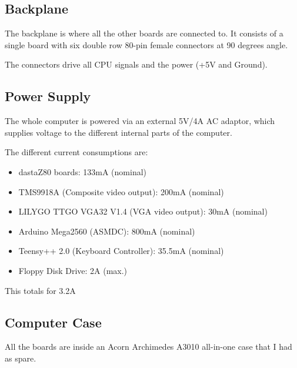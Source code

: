 \documentclass[a4paper,11pt]{article}
\begin{document}
    \subsection{Backplane}

    The backplane is where all the other boards are connected to. It consists
    of a single board with six double row 80-pin female connectors at 90 degrees
    angle.

    The connectors drive all CPU signals and the power (+5V and Ground).

    \subsection{Power Supply}

    The whole computer is powered via an external 5V/4A AC adaptor, which
    supplies voltage to the different internal parts of the computer.

    The different current consumptions are:

    \begin{itemize}
        \item dastaZ80 boards: 133mA (nominal)
        \item TMS9918A (Composite video output): 200mA (nominal)
        \item LILYGO TTGO VGA32 V1.4 (VGA video output): 30mA (nominal)
        \item Arduino Mega2560 (ASMDC): 800mA (nominal)
        \item Teensy++ 2.0 (Keyboard Controller): 35.5mA (nominal)
        \item Floppy Disk Drive: 2A (max.)
    \end{itemize}

    This totals for 3.2A

    \subsection{Computer Case}

    All the boards are inside an Acorn Archimedes A3010 all-in-one case that I
    had as spare.
\end{document}
